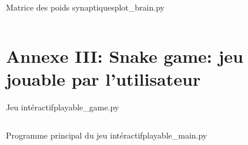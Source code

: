 \documentclass[10pt]{beamer}
\begin{document}
\begin{frame}[t,allowframebreaks]{Matrice des poids synaptiques}{plot\_brain.py}
\scriptsize
\inputminted[mathescape]{python}{../../snake-the-game/plot_brain.py}
\end{frame}

\section{Annexe III: \textbf{Snake game: jeu jouable par l'utilisateur}}

\begin{frame}[t,allowframebreaks]{Jeu intéractif}{playable\_game.py}
\scriptsize
\inputminted[mathescape]{python}{../../snake-the-game/playable-snake/playable_game.py}
\end{frame}

\begin{frame}[t,allowframebreaks]{Programme principal du jeu intéractif}{playable\_main.py}
\scriptsize
\inputminted[mathescape]{python}{../../snake-the-game/playable-snake/playable_main.py}
\end{frame}
\end{document}
